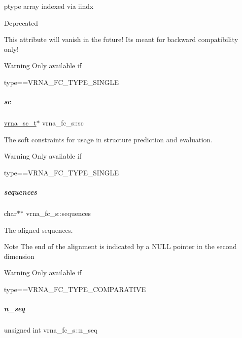 ptype array indexed via iindx 

\begin{DoxyRefDesc}{Deprecated}
\item[\mbox{\hyperlink{deprecated__deprecated000083}{Deprecated}}]This attribute will vanish in the future! It\textquotesingle{}s meant for backward compatibility only! \end{DoxyRefDesc}
\begin{DoxyWarning}{Warning}
Only available if\begin{DoxyVerb}type==VRNA_FC_TYPE_SINGLE \end{DoxyVerb}
 
\end{DoxyWarning}
\mbox{\label{group__fold__compound_ac7089e90460ad3990a308808c8044c9f}} 
\subparagraph{\texorpdfstring{sc}{sc}}
{\footnotesize\ttfamily \mbox{\hyperlink{group__soft__constraints_ga75401ce219ef8dbcceb672db82d434c6}{vrna\+\_\+sc\+\_\+t}}$\ast$ vrna\+\_\+fc\+\_\+s\+::sc}



The soft constraints for usage in structure prediction and evaluation. 

\begin{DoxyWarning}{Warning}
Only available if\begin{DoxyVerb}type==VRNA_FC_TYPE_SINGLE \end{DoxyVerb}
 
\end{DoxyWarning}
\mbox{\label{group__fold__compound_a965dbb42f2e13cace5aa3bbab4396530}} 
\subparagraph{\texorpdfstring{sequences}{sequences}}
{\footnotesize\ttfamily char$\ast$$\ast$ vrna\+\_\+fc\+\_\+s\+::sequences}



The aligned sequences. 

\begin{DoxyNote}{Note}
The end of the alignment is indicated by a N\+U\+LL pointer in the second dimension 
\end{DoxyNote}
\begin{DoxyWarning}{Warning}
Only available if\begin{DoxyVerb}type==VRNA_FC_TYPE_COMPARATIVE \end{DoxyVerb}
 
\end{DoxyWarning}
\mbox{\label{group__fold__compound_a614702ab74478e786272be44f8cebfe3}} 
\subparagraph{\texorpdfstring{n\+\_\+seq}{n\_seq}}
{\footnotesize\ttfamily unsigned int vrna\+\_\+fc\+\_\+s\+::n\+\_\+seq}




